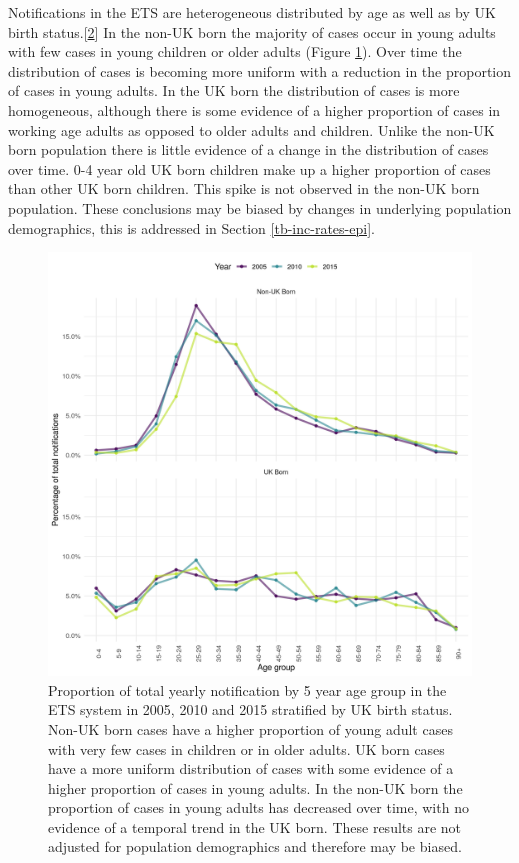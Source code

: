 \documentclass[11pt,twoside]{bristolthesis}
\begin{document}
  Notifications in the ETS are heterogeneous distributed by age as well as by UK birth status.{[}\protect\hyperlink{ref-PHE2017}{2}{]} In the non-UK born the majority of cases occur in young adults with few cases in young children or older adults (Figure \ref{fig:age-dist-cases-nots}). Over time the distribution of cases is becoming more uniform with a reduction in the proportion of cases in young adults. In the UK born the distribution of cases is more homogeneous, although there is some evidence of a higher proportion of cases in working age adults as opposed to older adults and children. Unlike the non-UK born population there is little evidence of a change in the distribution of cases over time. 0-4 year old UK born children make up a higher proportion of cases than other UK born children. This spike is not observed in the non-UK born population. These conclusions may be biased by changes in underlying population demographics, this is addressed in Section \ref{tb-inc-rates-epi}.
  \begin{figure}
  
  {\centering \includegraphics[width=0.8\linewidth,]{chapters/tb-epi-england/figures/plot-case-age-dist} 
  
  }
  
  \caption[Proportion of total yearly notification by 5 year age group in the ETS system in 2005, 2010 and 2015 stratified by UK birth status.]{Proportion of total yearly notification by 5 year age group in the ETS system in 2005, 2010 and 2015 stratified by UK birth status. Non-UK born cases have a higher proportion of young adult cases with very few cases in children or in older adults. UK born cases have a more uniform distribution of cases with some evidence of a higher proportion of cases in young adults. In the non-UK born the proportion of cases in young adults has decreased over time, with no evidence of a temporal trend in the UK born. These results are not adjusted for population demographics and therefore may be biased.}\label{fig:age-dist-cases-nots}
  \end{figure}
\end{document}
